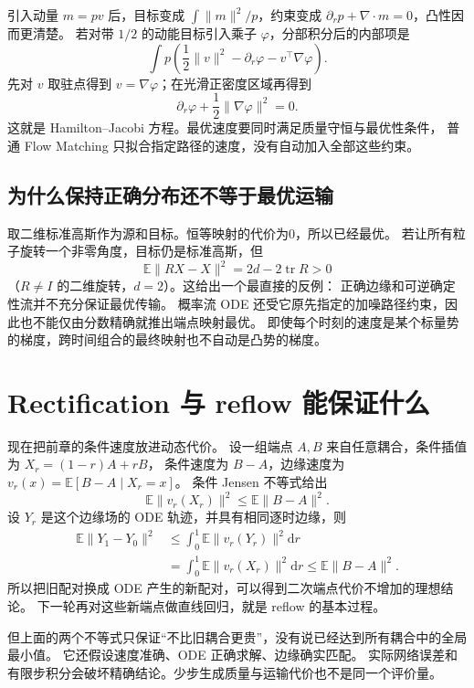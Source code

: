 引入动量 $m=pv$ 后，目标变成 $\int\|m\|^2/p$，约束变成
$\partial_rp+\nabla\cdot m=0$，凸性因而更清楚。
若对带 $1/2$ 的动能目标引入乘子 $\varphi$，分部积分后的内部项是
\[
\int p\left(\frac12\|v\|^2-\partial_r\varphi-v^\top\nabla\varphi\right).
\]
先对 $v$ 取驻点得到 $v=\nabla\varphi$；在光滑正密度区域再得到
\[
\partial_r\varphi+\frac12\|\nabla\varphi\|^2=0.
\]
这就是 Hamilton--Jacobi 方程。最优速度要同时满足质量守恒与最优性条件，
普通 Flow Matching 只拟合指定路径的速度，没有自动加入全部这些约束。

\subsection{为什么保持正确分布还不等于最优运输}
取二维标准高斯作为源和目标。恒等映射的代价为0，所以已经最优。
若让所有粒子旋转一个非零角度，目标仍是标准高斯，但
\[
\mathbb E\|RX-X\|^2=2d-2\operatorname{tr}R>0
\]
（$R\ne I$ 的二维旋转，$d=2$）。这给出一个最直接的反例：
正确边缘和可逆确定性流并不充分保证最优传输。
概率流 ODE 还受它原先指定的加噪路径约束，因此也不能仅由分数精确就推出端点映射最优。
即使每个时刻的速度是某个标量势的梯度，跨时间组合的最终映射也不自动是凸势的梯度。

\section{Rectification 与 reflow 能保证什么}
现在把前章的条件速度放进动态代价。
设一组端点 $A,B$ 来自任意耦合，条件插值为 $X_r=(1-r)A+rB$，
条件速度为 $B-A$，边缘速度为 $v_r(x)=\mathbb E[B-A\mid X_r=x]$。
条件 Jensen 不等式给出
\[
\mathbb E\|v_r(X_r)\|^2\leq\mathbb E\|B-A\|^2.
\]
设 $Y_r$ 是这个边缘场的 ODE 轨迹，并具有相同逐时边缘，则
\begin{align}
\mathbb E\|Y_1-Y_0\|^2
 &\leq\int_0^1\mathbb E\|v_r(Y_r)\|^2\mathrm dr\\
 &=\int_0^1\mathbb E\|v_r(X_r)\|^2\mathrm dr
 \leq\mathbb E\|B-A\|^2.
\label{supp:reflow-bound}
\end{align}
所以把旧配对换成 ODE 产生的新配对，可以得到二次端点代价不增加的理想结论。
下一轮再对这些新端点做直线回归，就是 reflow 的基本过程。

但上面的两个不等式只保证“不比旧耦合更贵”，没有说已经达到所有耦合中的全局最小值。
它还假设速度准确、ODE 正确求解、边缘确实匹配。
实际网络误差和有限步积分会破坏精确结论。少步生成质量与运输代价也不是同一个评价量。

